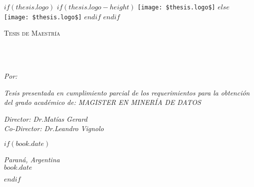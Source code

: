 \frontmatter %

\pagestyle{plain} %


\begin{titlepage}
\begin{center}

$if(thesis.logo)$
$if(thesis.logo-height)$
\texttt{[image: \$thesis.logo\$]} %
$else$
\texttt{[image: \$thesis.logo\$]}
$endif$
$endif$

\vspace*{.06\textheight}
\textsc{\Large Tesis de Maestría}\\[0.5cm] %

\HRule \\[0.4cm] %
{\bfseries \MakeUppercase{\ttitle}\par}\vspace{0.4cm} %
\HRule \\[1.5cm] %
 
\begin{center} \large
\emph{Por: }\authorname
\end{center}

\vspace{1cm}

\vfill

\large \textit{Tesis presentada en cumplimiento parcial de los requerimientos para la obtención del grado académico de:
MAGISTER EN MINERÍA DE DATOS}\\[0.3cm] %
 
\vfill


\begin{center} \large
\emph{Director: Dr.Matías Gerard} \\
\emph{Co-Director: Dr.Leandro Vignolo} \\
\end{center}

\vspace{1cm}
 

$if(book.date)$
\begin{flushright}
\emph{Paraná, Argentina} \\
{\large $book.date$}\\[1cm] %
\end{flushright}
$endif$

 
\vfill
\end{center}
\end{titlepage}

